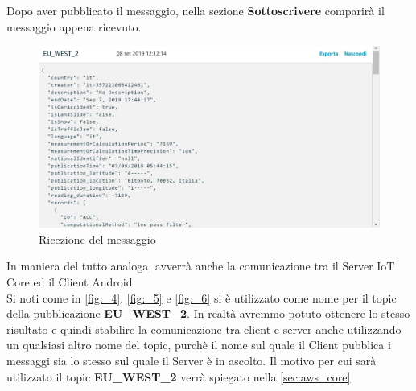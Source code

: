 Dopo aver pubblicato il messaggio, nella sezione \textbf{Sottoscrivere} comparirà il messaggio appena ricevuto.
\begin{figure}
	\begin{center}
		\includegraphics[width=1\columnwidth]{images/_6}
	\end{center}
	\caption{Ricezione del messaggio}
	\label{fig:_6}
\end{figure}
In maniera del tutto analoga, avverrà anche la comunicazione tra il Server IoT Core ed il Client Android. \\
Si noti come in \autoref{fig:_4}, \autoref{fig:_5} e \autoref{fig:_6} si è utilizzato come nome per il topic della pubblicazione \textbf{EU\_WEST\_2}. In realtà avremmo potuto ottenere lo stesso risultato e quindi stabilire la comunicazione tra client e server anche utilizzando un qualsiasi altro nome del topic, purchè il nome sul quale il Client pubblica i messaggi sia lo stesso sul quale il Server è in ascolto. Il motivo per cui sarà utilizzato il topic \textbf{EU\_WEST\_2} verrà spiegato nella \autoref{sec:aws_core}.

